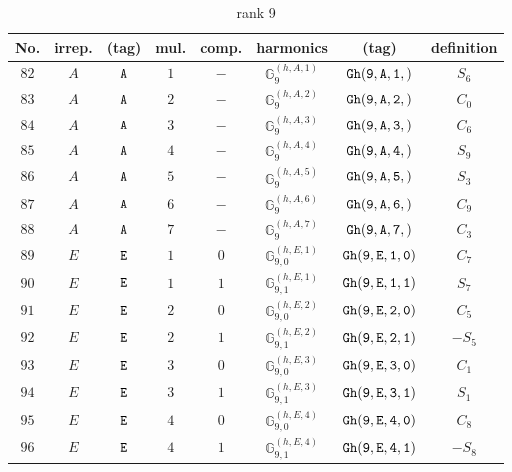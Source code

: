 \documentclass[fleqn,8pt]{jsarticle}
\begin{document}
\begin{table}[ht!]
\begin{center}
\caption{rank 9}
\renewcommand{\arraystretch}{1.3}
\begin{tabular}{cccccccc} \hline \hline
No. & irrep. & (tag) & mul. & comp. & harmonics & (tag) & definition \\ \hline
$ 82 $ & $ A $ & $ {\tt A} $ & $ 1 $ & $ - $ & $ \mathbb{G}_{9}^{(h,A,1)} $ & $ {\tt Gh(9,A,1,)} $ & $ S_{6} $ \\
$ 83 $ & $ A $ & $ {\tt A} $ & $ 2 $ & $ - $ & $ \mathbb{G}_{9}^{(h,A,2)} $ & $ {\tt Gh(9,A,2,)} $ & $ C_{0} $ \\
$ 84 $ & $ A $ & $ {\tt A} $ & $ 3 $ & $ - $ & $ \mathbb{G}_{9}^{(h,A,3)} $ & $ {\tt Gh(9,A,3,)} $ & $ C_{6} $ \\
$ 85 $ & $ A $ & $ {\tt A} $ & $ 4 $ & $ - $ & $ \mathbb{G}_{9}^{(h,A,4)} $ & $ {\tt Gh(9,A,4,)} $ & $ S_{9} $ \\
$ 86 $ & $ A $ & $ {\tt A} $ & $ 5 $ & $ - $ & $ \mathbb{G}_{9}^{(h,A,5)} $ & $ {\tt Gh(9,A,5,)} $ & $ S_{3} $ \\
$ 87 $ & $ A $ & $ {\tt A} $ & $ 6 $ & $ - $ & $ \mathbb{G}_{9}^{(h,A,6)} $ & $ {\tt Gh(9,A,6,)} $ & $ C_{9} $ \\
$ 88 $ & $ A $ & $ {\tt A} $ & $ 7 $ & $ - $ & $ \mathbb{G}_{9}^{(h,A,7)} $ & $ {\tt Gh(9,A,7,)} $ & $ C_{3} $ \\
$ 89 $ & $ E $ & $ {\tt E} $ & $ 1 $ & $ 0 $ & $ \mathbb{G}_{9,0}^{(h,E,1)} $ & $ {\tt Gh(9,E,1,0)} $ & $ C_{7} $ \\
$ 90 $ & $ E $ & $ {\tt E} $ & $ 1 $ & $ 1 $ & $ \mathbb{G}_{9,1}^{(h,E,1)} $ & $ {\tt Gh(9,E,1,1)} $ & $ S_{7} $ \\
$ 91 $ & $ E $ & $ {\tt E} $ & $ 2 $ & $ 0 $ & $ \mathbb{G}_{9,0}^{(h,E,2)} $ & $ {\tt Gh(9,E,2,0)} $ & $ C_{5} $ \\
$ 92 $ & $ E $ & $ {\tt E} $ & $ 2 $ & $ 1 $ & $ \mathbb{G}_{9,1}^{(h,E,2)} $ & $ {\tt Gh(9,E,2,1)} $ & $ - S_{5} $ \\
$ 93 $ & $ E $ & $ {\tt E} $ & $ 3 $ & $ 0 $ & $ \mathbb{G}_{9,0}^{(h,E,3)} $ & $ {\tt Gh(9,E,3,0)} $ & $ C_{1} $ \\
$ 94 $ & $ E $ & $ {\tt E} $ & $ 3 $ & $ 1 $ & $ \mathbb{G}_{9,1}^{(h,E,3)} $ & $ {\tt Gh(9,E,3,1)} $ & $ S_{1} $ \\
$ 95 $ & $ E $ & $ {\tt E} $ & $ 4 $ & $ 0 $ & $ \mathbb{G}_{9,0}^{(h,E,4)} $ & $ {\tt Gh(9,E,4,0)} $ & $ C_{8} $ \\
$ 96 $ & $ E $ & $ {\tt E} $ & $ 4 $ & $ 1 $ & $ \mathbb{G}_{9,1}^{(h,E,4)} $ & $ {\tt Gh(9,E,4,1)} $ & $ - S_{8} $ \\

\end{tabular}
\end{center}
\end{table}
\end{document}
